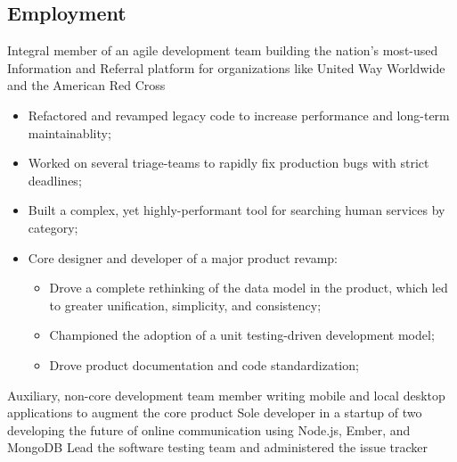 \documentclass[10pt,a4paper,sans]{moderncv}        %
\begin{document}
\subsection{Employment}
    {Integral member of an agile development team building the nation's most-used Information
    and Referral platform for organizations like United Way Worldwide and the American Red
    Cross\newline{}
\begin{itemize}
\item Refactored and revamped legacy code to increase performance and long-term
    maintainablity;
\item Worked on several triage-teams to rapidly fix production bugs with strict deadlines;
\item Built a complex, yet highly-performant tool for searching human services by category;
\item Core designer and developer of a major product revamp:
  \begin{itemize}
  \item Drove a complete rethinking of the data model in the product, which led to greater
        unification, simplicity, and consistency;
  \item Championed the adoption of a unit testing-driven development model;
  \item Drove product documentation and code standardization;
  \end{itemize}
\end{itemize}}
    {Auxiliary, non-core development team member writing mobile and local desktop
    applications to augment the core product\newline{}}
    {Sole developer in a startup of two developing the future of online communication using
    Node.js, Ember, and MongoDB}
    {Lead the software testing team and administered the issue tracker}
\end{document}
